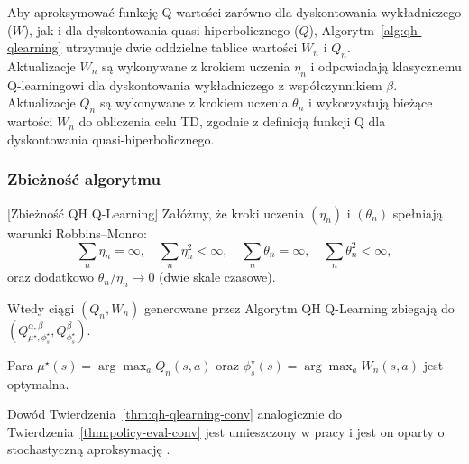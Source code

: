 Aby aproksymować funkcję Q-wartości zarówno dla dyskontowania wykładniczego ($W$), jak i dla dyskontowania quasi-hiperbolicznego ($Q$), Algorytm~\ref{alg:qh-qlearning} utrzymuje dwie oddzielne tablice wartości $W_n$ i $Q_n$. \\
Aktualizacje $W_n$ są wykonywane z krokiem uczenia $\eta_n$ i odpowiadają klasycznemu Q-learningowi dla dyskontowania wykładniczego z współczynnikiem $\beta$. Aktualizacje $Q_n$ są wykonywane z krokiem uczenia $\theta_n$ i wykorzystują bieżące wartości $W_n$ do obliczenia celu TD, zgodnie z definicją funkcji Q dla dyskontowania quasi-hiperbolicznego.\\
\subsubsection{Zbieżność algorytmu}

\begin{theorem}\cite{eshwar2025}[Zbieżność QH Q-Learning]
\label{thm:qh-qlearning-conv}
Załóżmy, że kroki uczenia $(\eta_n)$ i $(\theta_n)$ spełniają warunki Robbins--Monro:
\[
\sum_n \eta_n = \infty, \quad \sum_n \eta_n^2 < \infty, \quad \sum_n \theta_n = \infty, \quad \sum_n \theta_n^2 < \infty,
\]
 oraz dodatkowo $\theta_n / \eta_n \to 0$ (dwie skale czasowe). 

Wtedy ciągi $(Q_n, W_n)$ generowane przez Algorytm QH Q-Learning zbiegają do $(Q^{\alpha, \beta}_{\mu^\star, \phi_s^\star}, Q^{\beta}_{\phi_s^\star})$. 

Para $\mu^\star(s) = \arg\max_a Q_n(s,a)$ oraz $\phi_s^\star(s) = \arg\max_a W_n(s,a)$ jest optymalna.
\end{theorem}

Dowód Twierdzenia~\ref{thm:qh-qlearning-conv} analogicznie do Twierdzenia~\ref{thm:policy-eval-conv} jest umieszczony w pracy \cite{eshwar2025} i jest on oparty o stochastyczną aproksymację \cite{borkar2008}.



